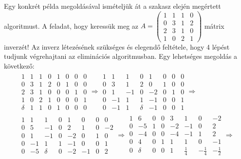 \documentclass[9pt, showtrims]{memoir}
\theoremstyle{plain}
\theoremstyle{remark}
\theoremstyle{definition}
\begin{document}
Egy konkrét példa megoldásával ismételjük át a szakasz elején megértett algoritmust.
A feladat, hogy keressük meg az 
\(
A=
\begin{pmatrix}
    1&1&1&0\\
    0&3&1&2\\
    2&3&1&0\\
    1&0&2&1
\end{pmatrix}
\)
mátrix inverzét!
Az inverz létezésének szükséges és elegendő feltétele, hogy 4 lépést tudjunk végrehajtani az eliminációs algoritmusban.
Egy lehetséges megoldás a következő:
\begin{multline*}
    \begin{array}{cccc|cccc}
        \boxed{1}&1&1&0 & 1&0&0&0\\
        0&3&1&2 & 0&1&0&0\\
        2&3&1&0 & 0&0&1&0\\
        1&0&2&1 & 0&0&0&1\\
        \hline
        \delta&1&1&0&1&0&0&0
    \end{array}\Rightarrow
    \begin{array}{cccc|cccc}
        1&1&1&0 & 1&0&0&0\\
        0&3&1&2 & 0&1&0&0\\
        0&1&-1&0 & -2&0&1&0\\
        0&-1&1&\boxed{1} & -1&0&0&1\\
        \hline
        0&-1&1&\delta&-1&0&0&1
    \end{array}\Rightarrow
    \\
    \begin{array}{cccc|cccc}
        1&1&1&0 & 1&0&0&0\\
        0&5&\boxed{-1}&0 & 2&1&0&-2\\
        0&1&-1&0 & -2&0&1&0\\
        0&-1&1&1 & -1&0&0&1\\
        \hline
        0&-5&\delta&0&-2&-1&0&2
    \end{array}\Rightarrow
    \begin{array}{cccc|cccc}
        1&6&0&0 & 3&1&0&-2\\
        0&-5&1&0 & -2&-1&0&2\\
        0&\boxed{-4}&0&0 & -4&-1&1&2\\
        0&4&0&1 & 1&1&0&-1\\
        \hline
        0&\delta&0&0&1&\frac{1}{4}&-\frac{1}{4}&-\frac{1}{2}
    \end{array}\Rightarrow
    \\

\end{multline*}
\end{document}
